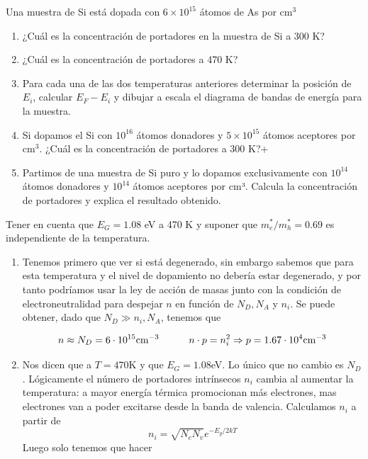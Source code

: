 \begin{texercise}
	Una muestra de Si está dopada con \( 6 \times 10^{15} \) átomos de As por cm$^3$
	\begin{enumerate}[label=\alph*)]
		\item ¿Cuál es la concentración de portadores en la muestra de Si a 300 K?
		\item ¿Cuál es la concentración de portadores a 470 K?
		\item Para cada una de las dos temperaturas anteriores determinar la posición de \( E_i \), calcular \( E_F - E_i \) y dibujar a escala el diagrama de bandas de energía para la muestra.
		\item Si dopamos el Si con \( 10^{16} \) átomos donadores y \( 5 \times 10^{15} \) átomos aceptores por cm$^3$. ¿Cuál es la concentración de portadores a 300 K?+
		\item Partimos de una muestra de Si puro y lo dopamos exclusivamente con \( 10^{14} \) átomos donadores y \( 10^{14} \) átomos aceptores por cm³. Calcula la concentración de portadores y explica el resultado obtenido.
	\end{enumerate}
	Tener en cuenta que \( E_G = 1.08 \) eV a 470 K y suponer que \( m_e^*/m_h^* = 0.69 \) es independiente de la temperatura.

	\tcblower
	\begin{enumerate}[label=\alph*)]	
		\item Tenemos primero que ver si está degenerado, sin embargo sabemos que para esta temperatura y el nivel de dopamiento no debería estar degenerado, y por tanto podríamos usar la ley de acción de masas junto con la condición de electroneutralidad para despejar $n$ en función de $N_D,N_A$ y $n_i$. Se puede obtener, dado que $N_D \gg n_i,N_A$, tenemos que 

		\begin{equation}
			n\approx N_D = 6\cdot 10^{15} \text{cm}^{-3} \quad \quad \quad n\cdot p = n_i^2 \Rightarrow p = 1.67 \cdot 10^4 \text{cm}^{-3}
		\end{equation}
		\item Nos dicen que a $T=470$K y que $E_G=1.08$eV. Lo único que no cambio es $N_D$. Lógicamente el número de portadores intrínsecos $n_i$ cambia al aumentar la temperatura: a mayor energía térmica promocionan más electrones, mas electrones van a poder excitarse desde la banda de valencia. Calculamos $n_i$ a partir de 
		\begin{equation}
			n_i = \sqrt{N_cN_v} e^{-E_g/2kT}
		\end{equation}
		Luego solo tenemos que hacer 


\end{enumerate}
\end{texercise}
